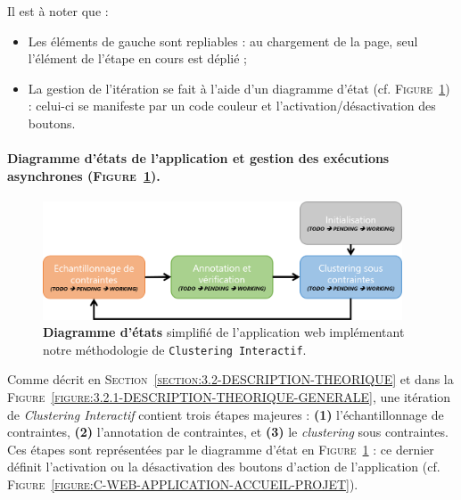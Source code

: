 			Il est à noter que :
			\begin{itemize}
				\item Les éléments de gauche sont repliables : au chargement de la page, seul l'élément de l'étape en cours est déplié ;
				\item La gestion de l'itération se fait à l'aide d'un diagramme d'état (cf. \textsc{Figure~\ref{figure:C-WEB-APPLICATION-DIAGRAMME-ETATS}}) : celui-ci se manifeste par un code couleur et l'activation/désactivation des boutons.
			\end{itemize}
		
		
		\paragraph{Diagramme d'états de l'application et gestion des exécutions asynchrones (\textsc{Figure~\ref{figure:C-WEB-APPLICATION-DIAGRAMME-ETATS}}).}
			
			\begin{figure}[H]
				\centering
				\includegraphics[width=0.95\textwidth]{figures/interactive-clustering-application-diagramme-etats}
				\caption{
					\textbf{Diagramme d'états} simplifié de l'application web implémentant notre méthodologie de \texttt{Clustering Interactif}.
				}
				\label{figure:C-WEB-APPLICATION-DIAGRAMME-ETATS}
			\end{figure}
			
			Comme décrit en \textsc{Section~\ref{section:3.2-DESCRIPTION-THEORIQUE}} et dans la \textsc{Figure~\ref{figure:3.2.1-DESCRIPTION-THEORIQUE-GENERALE}}, une itération de \textit{Clustering Interactif} contient trois étapes majeures : \textbf{(1)} l'échantillonnage de contraintes, \textbf{(2)} l'annotation de contraintes, et \textbf{(3)} le \textit{clustering} sous contraintes.
			Ces étapes sont représentées par le diagramme d'état en \textsc{Figure~\ref{figure:C-WEB-APPLICATION-DIAGRAMME-ETATS}} : ce dernier définit l'activation ou la désactivation des boutons d'action de l'application (cf. \textsc{Figure~\ref{figure:C-WEB-APPLICATION-ACCUEIL-PROJET}}).
			
